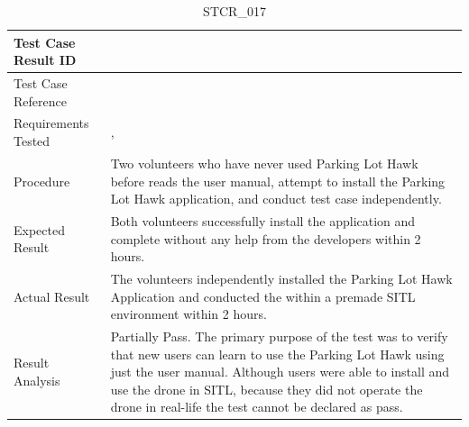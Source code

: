 \documentclass[12pt, titlepage]{article}
\begin{document}
\begin{table}[!h]
\begin{center}
\caption {STCR\_017}
\label{tab:STCR_017}
\begin{tabular}{ | m{3.2cm} | m{12.2cm} | } 
\hline
Test Case Result ID & \nameref{tab:STCR_017} \\ 
\hline
Test Case Reference & \nameref{tab:STC_017}  \\ 
\hline
Requirements Tested & \nameref{tab:STC_012}, \nameref{USE_004} 
\\ 
\hline
Procedure & Two volunteers who have never used Parking Lot Hawk before reads the user manual, attempt to install the Parking Lot Hawk application, and conduct test case \nameref{tab:STC_012} independently. \\
\hline
Expected Result & Both volunteers successfully install the application and complete \nameref{tab:STC_012} without any help from the developers within 2 hours.  \\ 
\hline
Actual Result &  The volunteers independently installed the Parking Lot Hawk Application and conducted the \nameref{tab:STC_012} within a premade SITL environment within 2 hours. \\
\hline
Result Analysis & Partially Pass. The primary purpose of the test was to verify that new users can learn to use the Parking Lot Hawk using just the user manual. Although users were able to install and use the drone in SITL, because they did not operate the drone in real-life the test cannot be declared as pass.    \\ 
\hline
\end{tabular}
\end{center}
\end{table}
\end{document}

